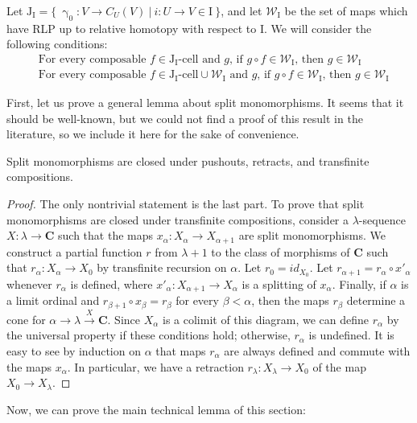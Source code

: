 \documentclass{tac}
\theoremstyle{definition}
\newcommand{\we}{\mathcal{W}}
\newcommand{\cat}[1]{\mathbf{#1}}
\newcommand{\C}{\cat{C}}
\newcommand{\I}{\mathrm{I}}
\newcommand{\J}{\mathrm{J}}
\newcommand{\class}[2]{#1\text{-}\mathrm{#2}}
\newcommand{\Icell}[1][\I]{\class{#1}{cell}}
\newcommand{\Jcell}[1][]{\Icell[\J#1]}
\newcommand{\cyli}{\upgamma}
\begin{document}
Let $\J_\I = \{\ \cyli_0 : V \to C_U(V)\ |\ i : U \to V \in \I \ \}$, and
let $\we_\I$ be the set of maps which have RLP up to relative homotopy with respect to $\I$.
We will consider the following conditions:
\begin{align}
& \text{For every composable $f \in \Jcell[_\I]$ and $g$, if $g \circ f \in \we_\I$, then $g \in \we_\I$} \label{cond:main} \tag{*} \\
& \text{For every composable $f \in \Jcell[_\I] \cup \we_\I$ and $g$, if $g \circ f \in \we_\I$, then $g \in \we_\I$} \label{cond:strong-main} \tag{*'}
\end{align}

First, let us prove a general lemma about split monomorphisms.
It seems that it should be well-known, but we could not find a proof of this result in the literature, so we include it here for the sake of convenience.

\begin{lem}
Split monomorphisms are closed under pushouts, retracts, and transfinite compositions.
\end{lem}
\begin{proof}
The only nontrivial statement is the last part.
To prove that split monomorphisms are closed under transfinite compositions, consider a $\lambda$-sequence $X : \lambda \to \C$ such that the maps $x_\alpha : X_\alpha \to X_{\alpha+1}$ are split monomorphisms.
We construct a partial function $r$ from $\lambda+1$ to the class of morphisms of $\C$ such that $r_\alpha : X_\alpha \to X_0$ by transfinite recursion on $\alpha$.
Let $r_0 = id_{X_0}$.
Let $r_{\alpha+1} = r_\alpha \circ x'_\alpha$ whenever $r_\alpha$ is defined, where $x'_\alpha : X_{\alpha+1} \to X_\alpha$ is a splitting of $x_\alpha$.
Finally, if $\alpha$ is a limit ordinal and $r_{\beta+1} \circ x_\beta = r_\beta$ for every $\beta < \alpha$,
then the maps $r_\beta$ determine a cone for $\alpha \to \lambda \xrightarrow{X} \C$.
Since $X_\alpha$ is a colimit of this diagram, we can define $r_\alpha$ by the universal property if these conditions hold; otherwise, $r_\alpha$ is undefined.
It is easy to see by induction on $\alpha$ that maps $r_\alpha$ are always defined and commute with the maps $x_\alpha$.
In particular, we have a retraction $r_\lambda : X_\lambda \to X_0$ of the map $X_0 \to X_\lambda$.
\end{proof}

Now, we can prove the main technical lemma of this section:
\end{document}
